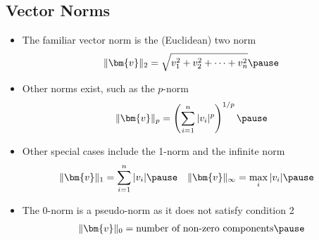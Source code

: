 \begin{slide}
\section[-2]{Vector Norms}

\begin{PauseHighLight}\small
  \begin{itemize}\squeeze
  \item The familiar vector norm is the (Euclidean) two norm
    \begin{align*}
      \| \bm{v} \|_2 = \sqrt{v_1^2 + v_2^2 + \cdots + v_n^2}\pause
    \end{align*}
  \item Other norms exist, such as the $p$-norm
    \begin{align*}
      \| \bm{v} \|_p = \left(\sum_{i=1}^n | v_i |^p \right)^{1/p}\pause
    \end{align*}
  \item Other special cases include the 1-norm and the infinite norm
    \begin{align*}
      \| \bm{v} \|_1 &= \sum_{i=1}^n | v_i |\pause & \| \bm{v} \|_{\infty} &= \max_i |v_i|\pause
    \end{align*}
  \item The 0-norm is a pseudo-norm as it does not satisfy condition 2
    \begin{align*}
      \| \bm{v} \|_0 = \text{number of non-zero components}\pause
    \end{align*}
  \end{itemize}
\end{PauseHighLight}

\end{slide}


